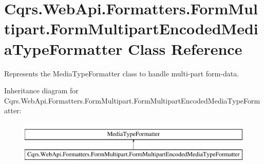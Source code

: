 \hypertarget{classCqrs_1_1WebApi_1_1Formatters_1_1FormMultipart_1_1FormMultipartEncodedMediaTypeFormatter}{}\section{Cqrs.\+Web\+Api.\+Formatters.\+Form\+Multipart.\+Form\+Multipart\+Encoded\+Media\+Type\+Formatter Class Reference}
\label{classCqrs_1_1WebApi_1_1Formatters_1_1FormMultipart_1_1FormMultipartEncodedMediaTypeFormatter}


Represents the Media\+Type\+Formatter class to handle multi-\/part form-\/data.  


Inheritance diagram for Cqrs.\+Web\+Api.\+Formatters.\+Form\+Multipart.\+Form\+Multipart\+Encoded\+Media\+Type\+Formatter\+:\begin{figure}[H]
\begin{center}
\leavevmode
\includegraphics[height=2.000000cm]{classCqrs_1_1WebApi_1_1Formatters_1_1FormMultipart_1_1FormMultipartEncodedMediaTypeFormatter}
\end{center}
\end{figure}
